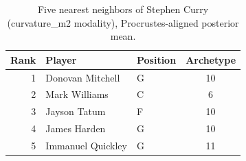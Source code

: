 \begin{table}[htbp]
  \centering\small
  \begin{tabular}{rllc}
    \toprule
    Rank & Player & Position & Archetype \\
    \midrule
    1 & Donovan Mitchell & G & 10 \\
    2 & Mark Williams & C & 6 \\
    3 & Jayson Tatum & F & 10 \\
    4 & James Harden & G & 10 \\
    5 & Immanuel Quickley & G & 11 \\
    \bottomrule
  \end{tabular}
  \caption{Five nearest neighbors of Stephen Curry (curvature_m2 modality), Procrustes-aligned posterior mean.}
  \label{tab:Stephen_Curry_neighbors_curvature_m2}
\end{table}

